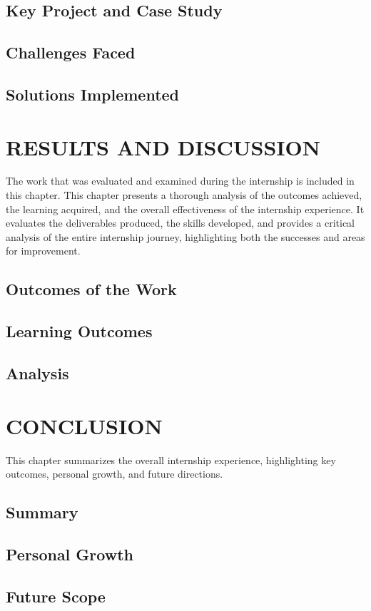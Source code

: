 \documentclass[12pt,a4paper]{report}
\begin{document}
\section{Key Project and Case Study}




\section{Challenges Faced}


\section{Solutions Implemented}


\chapter{RESULTS AND DISCUSSION}
\label{ch:results}


The work that was evaluated and examined during the internship is included in this chapter. This chapter presents a thorough analysis of the outcomes achieved, the learning acquired, and the overall effectiveness of the internship experience. It evaluates the deliverables produced, the skills developed, and provides a critical analysis of the entire internship journey, highlighting both the successes and areas for improvement.




\section{Outcomes of the Work}


\section{Learning Outcomes}


\section{Analysis}




\chapter{CONCLUSION}
\label{ch:conclusion}


This chapter summarizes the overall internship experience, highlighting key outcomes, personal growth, and future directions.




\section{Summary}


\section{Personal Growth}


\section{Future Scope}
\end{document}
